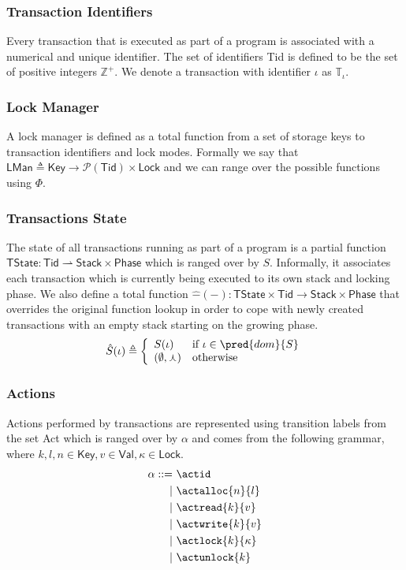 \subsubsection{Transaction Identifiers}

Every transaction that is executed as part of a program is associated with a numerical and unique identifier. The set of identifiers \textsf{Tid} is defined to be the set of positive integers $\mathds{Z}^+$. We denote a transaction with identifier $\iota$ as $\mathds{T}_\iota$.

\subsubsection{Lock Manager}

A lock manager is defined as a total function from a set of storage keys to transaction identifiers and lock modes. Formally we say that $\mathsf{LMan} \triangleq \mathsf{Key} \rightarrow \mathcal{P}(\mathsf{Tid}) \times \mathsf{Lock}$ and we can range over the possible functions using $\Phi$.

\subsubsection{Transactions State}

The state of all transactions running as part of a program is a partial function $\mathsf{TState} : \mathsf{Tid} \rightharpoonup \mathsf{Stack} \times \mathsf{Phase}$ which is ranged over by $S$. Informally, it associates each transaction which is currently being executed to its own stack and locking phase. We also define a total function $\hat{-}(-) : \mathsf{TState} \times \mathsf{Tid} \rightarrow \mathsf{Stack} \times \mathsf{Phase}$ that overrides the original function lookup in order to cope with newly created transactions with an empty stack starting on the growing phase.
\[
\hat{S}(\iota) \triangleq \bigg\{ \begin{array}{l l}
S(\iota) & \text{if } \iota \in \pred{dom}{S} \\
(\emptyset, \curlywedge) & \text{otherwise}
\end{array}
\]

\subsubsection{Actions}

Actions performed by transactions are represented using transition labels from the set \textsf{Act} which is ranged over by $\alpha$ and comes from the following grammar, where $k, l, n \in \mathsf{Key}, v \in \mathsf{Val}, \kappa \in \mathsf{Lock}$.
\begin{align*}
\alpha ::=&
\ \actid \\
|&\ \actalloc{n}{l} \\
|&\ \actread{k}{v} \\
|&\ \actwrite{k}{v} \\
|&\ \actlock{k}{\kappa} \\
|&\ \actunlock{k}
\end{align*}

